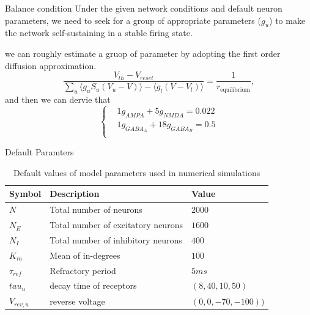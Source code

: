 \documentclass{beamer}
\begin{document}
\begin{frame}{Balance condition}
	Under the given network conditions and default neuron parameters, we need to seek for a group of appropriate parameters ($ g_{u} $) to make the network self-sustaining in a stable firing state.
	
	\par 
	we can roughly estimate a gruop of parameter by adopting the first order diffusion approximation.
	\begin{equation*}
		\dfrac{V_{th} - V_{reset}}{\sum_{u} \langle g_{u}S_{u}(V_u - V) \rangle - \langle g_{l}(V - V_{l})\rangle} = \dfrac{1 }{r_{\text{equilibrium}}},
	\end{equation*}	
	and then we can dervie that
	\begin{equation}
		\label{eq:param_restriction}
		\left\{
		\begin{aligned}
			&1 g_{AMPA} + 5 g_{NMDA} = 0.022 \\
			&1 g_{GABA_{A}} + 18 g_{GABA_{B}} = 0.5\\
		\end{aligned}
		\right .
	\end{equation}
	\par 
	
\end{frame}

\begin{frame}{Default Paramters}
	\begin{table}
		\centering
		\begin{tabular}{lll}
			Symbol & Description & Value\\
			\hline
			$N$ & Total number of neurons & $2000$\\
			$N_{E}$ & Total number of excitatory neurons & $1600$ \\
			$N_{I}$ & Total number of inhibitory neurons & $400$ \\
			$K_{in}$ &  Mean of in-degrees & $100$ \\
			$\tau_{ref}$ & Refractory period & $5ms$ \\
			$tau_{u}$ & decay time of receptors & $(8, 40, 10, 50)$ \\
			$V_{rev, u}$ & reverse voltage & $(0, 0, -70, -100))$ \\
		\end{tabular}
		\caption{Default values of model parameters used in numerical simulations}
		\label{tab:model_tabel}
	\end{table}
\end{frame}
\end{document}
